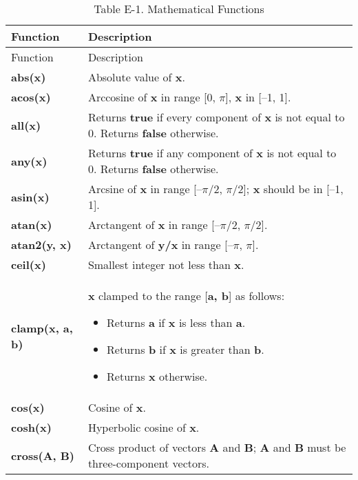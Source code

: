 \documentclass[../main.tex]{subfiles}
\begin{document}
\FloatBarrier
\begin{longtable}{ p{3cm} p{9cm}  }
\caption{Table E-1. Mathematical Functions\label{table:E-1}} \\

Function & Description \\
\hline
\endfirsthead
Function & Description \\
\hline
\endhead
\endfoot
\endlastfoot

\textbf{abs(x)} & Absolute value of \textbf{x}. \\
\hline
\textbf{acos(x)} & Arccosine of \textbf{x} in range [0, $\pi$], \textbf{x} in [–1, 1]. \\
\hline
\textbf{all(x)} & Returns \textbf{true} if every component of \textbf{x} is not equal to 0. \newline Returns \textbf{false} otherwise. \\
\hline
\textbf{any(x)} & Returns \textbf{true} if any component of \textbf{x} is not equal to 0. \newline Returns \textbf{false} otherwise. \\
\hline
\textbf{asin(x)} & Arcsine of \textbf{x} in range [–$\pi$/2, $\pi$/2]; \textbf{x} should be in [–1, 1]. \\
\hline
\textbf{atan(x)} & Arctangent of \textbf{x} in range [–$\pi$/2, $\pi$/2]. \\
\hline
\textbf{atan2(y, x)} & Arctangent of \textbf{y/x} in range [–$\pi$, $\pi$]. \\
\hline
\textbf{ceil(x)} & Smallest integer not less than \textbf{x}. \\
\hline
\textbf{clamp(x, a, b)} & \textbf{x} clamped to the range [\textbf{a, b}] as follows: \begin{itemize} \item Returns \textbf{a} if \textbf{x} is less than \textbf{a}. \item Returns \textbf{b} if \textbf{x} is greater than \textbf{b}. \item Returns \textbf{x} otherwise. \end{itemize} \\
\hline
\textbf{cos(x)} & Cosine of \textbf{x}. \\
\hline
\textbf{cosh(x)} & Hyperbolic cosine of \textbf{x}. \\
\hline
\textbf{cross(A, B)} & Cross product of vectors \textbf{A} and \textbf{B}; \newline \textbf{A} and \textbf{B} must be three-component vectors. \\

\end{longtable}
\end{document}
